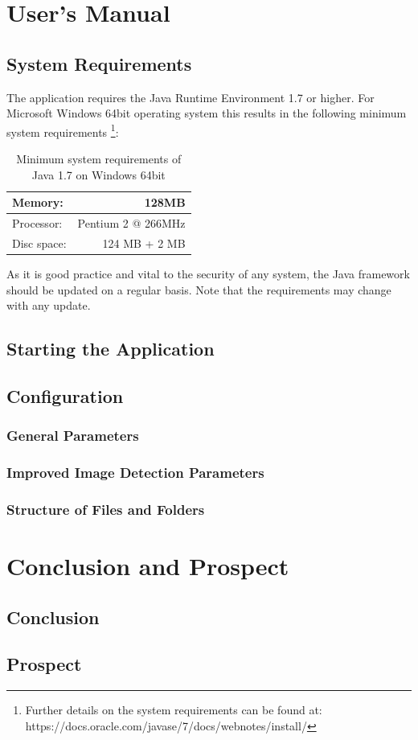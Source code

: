 \documentclass[a4paper, 11pt]{article}
\begin{document}
\section{User's Manual}

\subsection{System Requirements}
The application requires the Java Runtime Environment 1.7 or higher. For
Microsoft Windows 64bit operating system this results in the following minimum
system requirements \footnote{Further details on the system requirements can be
found at:
https://docs.oracle.com/javase/7/docs/webnotes/install/}:

\begin{table}[h]
	\centering
	\begin{tabular}{ l | r }
	  Memory: & 128MB \\
	  \hline
	  Processor: & Pentium 2 @ 266MHz \\
	  \hline
	  Disc space: & 124 MB + 2 MB \\
	\end{tabular}
	\caption{Minimum system requirements of Java 1.7 on Windows 64bit}
	\label{tab:system_requirements_java7}
\end{table}

As it is good practice and vital to the security of any system, the Java
framework should be updated on a regular basis. Note that the requirements may
change with any update.

\subsection{Starting the Application}


\subsection{Configuration}
\subsubsection{General Parameters}
\subsubsection{Improved Image Detection Parameters}
\subsubsection{Structure of Files and Folders}

\newpage
\section{Conclusion and Prospect}
 
\subsection{Conclusion}

\subsection{Prospect}


\newpage
{}

\end{document}
